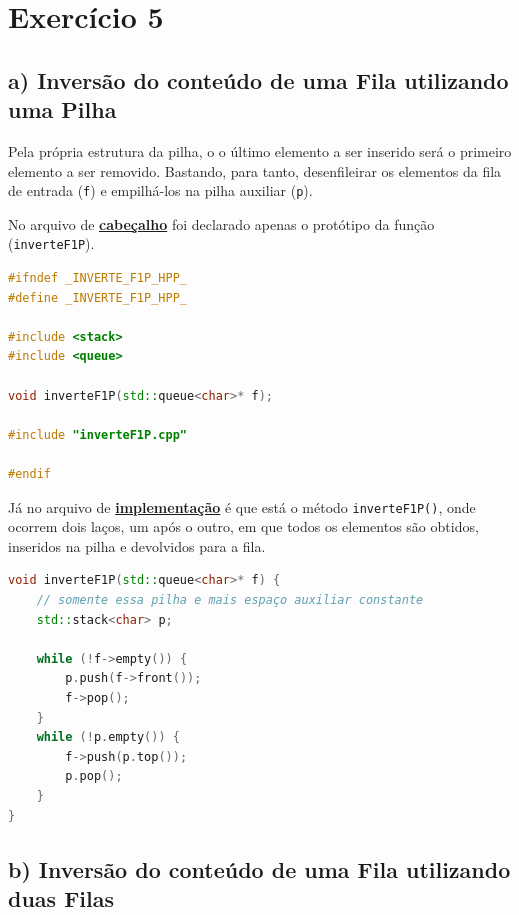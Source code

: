 \documentclass[
  brazilian,
  paper=a4,
  oneside  ,captions=tableheading
]{scrbook}
\newcommand{\passthrough}[1]{#1}
\begin{document}
\hypertarget{exercuxedcio-5}{%
\chapter{Exercício 5}\label{exercuxedcio-5}}

\hypertarget{a-inversuxe3o-do-conteuxfado-de-uma-fila-utilizando-uma-pilha}{%
\section{a) Inversão do conteúdo de uma Fila utilizando uma
Pilha}\label{a-inversuxe3o-do-conteuxfado-de-uma-fila-utilizando-uma-pilha}}

Pela própria estrutura da pilha, o o último elemento a ser inserido será
o primeiro elemento a ser removido. Bastando, para tanto, desenfileirar
os elementos da fila de entrada (\passthrough{\lstinline!f!}) e
empilhá-los na pilha auxiliar (\passthrough{\lstinline!p!}).

No arquivo de
\href{https://github.com/ecostadelle/lista_pilhas_filas/blob/main/include/inverteF1P.hpp}{\textbf{cabeçalho}}
foi declarado apenas o protótipo da função
(\passthrough{\lstinline!inverteF1P!}).

\begin{lstlisting}[language={C++}]
#ifndef _INVERTE_F1P_HPP_
#define _INVERTE_F1P_HPP_

#include <stack>
#include <queue>

void inverteF1P(std::queue<char>* f);

#include "inverteF1P.cpp"   

#endif
\end{lstlisting}

Já no arquivo de
\href{https://github.com/ecostadelle/lista_pilhas_filas/blob/main/include/inverteF1P.cpp}{\textbf{implementação}}
é que está o método \passthrough{\lstinline!inverteF1P()!}, onde ocorrem
dois laços, um após o outro, em que todos os elementos são obtidos,
inseridos na pilha e devolvidos para a fila.

\begin{lstlisting}[language={C++}]
void inverteF1P(std::queue<char>* f) { 
    // somente essa pilha e mais espaço auxiliar constante
    std::stack<char> p;

    while (!f->empty()) {
        p.push(f->front());
        f->pop();
    }
    while (!p.empty()) {
        f->push(p.top());
        p.pop();
    }
}
\end{lstlisting}

\hypertarget{b-inversuxe3o-do-conteuxfado-de-uma-fila-utilizando-duas-filas}{%
\section{b) Inversão do conteúdo de uma Fila utilizando duas
Filas}\label{b-inversuxe3o-do-conteuxfado-de-uma-fila-utilizando-duas-filas}}
\end{document}
